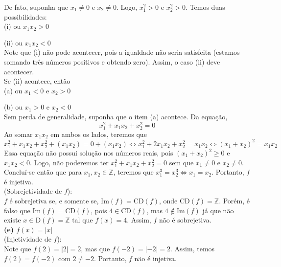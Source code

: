 \documentclass[12pt, a4paper]{article}
\begin{document}
De fato, suponha que \(x_1 \neq 0\) e \(x_2 \neq 0\). Logo,  \(x_1^2 > 0\) e \(x_2^2 > 0\). Temos duas possibilidades: \\

(i) ou \(x_1x_2 > 0\)

(ii) ou \(x_1x_2 < 0\) \\

Note que (i) não pode acontecer, pois a igualdade não seria satisfeita (estamos somando três números positivos e obtendo zero). Assim, o caso (ii) deve acontecer. \\

Se (ii) acontece, então \\

(a) ou \(x_1 < 0\) e \(x_2>0\)

(b) ou \(x_1 > 0\) e \(x_2 <0\) \\

Sem perda de generalidade, suponha que o item (a) acontece. Da equação, \[x_1^2 + x_1x_2 +x_2^2 = 0\]Ao somar \(x_1x_2\) em ambos os lados, teremos que \[x_1^2 + x_1x_2 +x_2^2 + (x_1x_2) = 0+(x_1x_2) \Longleftrightarrow x_1^2 + 2x_1x_2 +x_2^2 = x_1x_2 \Longleftrightarrow (x_1 + x_2)^2 = x_1x_2\] Essa equação não possui solução nos números reais, pois \((x_1+x_2)^2 \geq 0\) e \(x_1x_2 < 0\). Logo, não poderemos ter \(x_1^2 + x_1x_2 +x_2^2 = 0\) sem que \(x_1 \neq 0\) e \(x_2 \neq 0\). \\

Concluí-se então que para \(x_1, x_2 \in \mathbb{Z}\), teremos que \(x_1^3 = x_2^3 \Longleftrightarrow x_1 = x_2\). Portanto, \(f\) é injetiva. \\

(Sobrejetividade de \(f\)): \\
\(f\) é sobrejetiva se, e somente se, \(\mathrm{Im}(f) = \mathrm{CD}(f)\), onde \(\mathrm{CD}(f) = \mathbb{Z}\). Porém, é falso que \(\mathrm{Im}(f) = \mathrm{CD}(f)\), pois \(4 \in \mathrm{CD}(f)\), mas \(4 \notin \mathrm{Im}(f)\) já que não existe \(x \in \mathrm{D}(f)= \mathbb{Z}\) tal que \(f(x) = 4\). Assim, \(f\) não é sobrejetiva. \\


\textbf{(e) \(f(x) = |x|\)} \\

(Injetividade de \(f\)): \\
Note que \(f(2) = |2| =2\), mas que \(f(-2)=|-2| =2\). Assim, temos \(f(2)=f(-2)\) com \(2 \neq -2\). Portanto, \(f\) não é injetiva. \\
\end{document}
